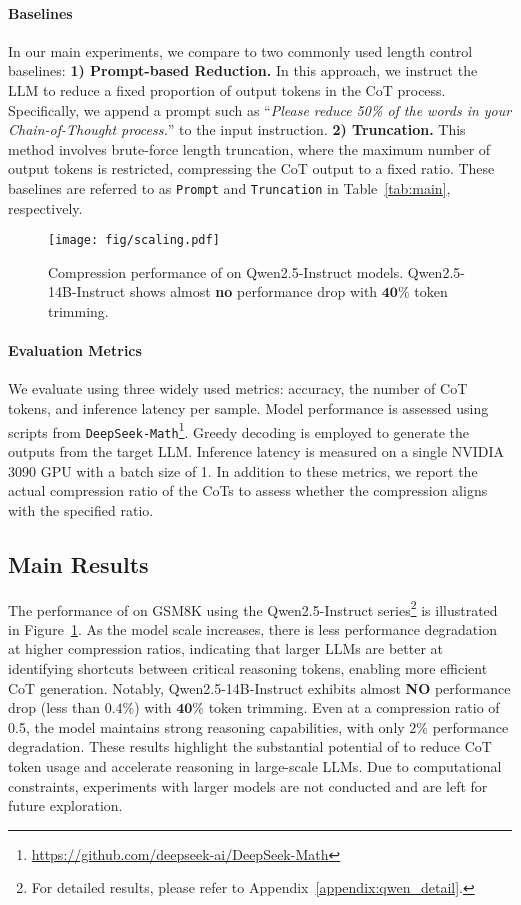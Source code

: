 \paragraph{Baselines} 
In our main experiments, we compare \method to two commonly used length control baselines: \textbf{1) Prompt-based Reduction.} In this approach, we instruct the LLM to reduce a fixed proportion of output tokens in the CoT process. Specifically, we append a prompt such as ``\textit{Please reduce 50\% of the words in your Chain-of-Thought process.}'' to the input instruction. \textbf{2) Truncation.} This method involves brute-force length truncation, where the maximum number of output tokens is restricted, compressing the CoT output to a fixed ratio. These baselines are referred to as \texttt{Prompt} and \texttt{Truncation} in Table~\ref{tab:main}, respectively.

\begin{figure}[t]
\centering
    \texttt{[image: fig/scaling.pdf]}
    \caption{Compression performance of \method on Qwen2.5-Instruct models. Qwen2.5-14B-Instruct shows almost \textbf{no} performance drop with $\bm{40\%}$ token trimming.}
    \label{fig:qwen-scaling}
\end{figure}

\paragraph{Evaluation Metrics} 
We evaluate \method using three widely used metrics: accuracy, the number of CoT tokens, and inference latency per sample. Model performance is assessed using scripts from \texttt{DeepSeek-Math}\footnote{\url{https://github.com/deepseek-ai/DeepSeek-Math}}. Greedy decoding is employed to generate the outputs from the target LLM. Inference latency is measured on a single NVIDIA 3090 GPU with a batch size of 1. In addition to these metrics, we report the actual compression ratio of the CoTs to assess whether the compression aligns with the specified ratio.



\subsection{Main Results}
\label{sec:main-exp}
The performance of \method on GSM8K using the Qwen2.5-Instruct series\footnote{For detailed results, please refer to Appendix~\ref{appendix:qwen_detail}.} is illustrated in Figure~\ref{fig:qwen-scaling}. As the model scale increases, there is less performance degradation at higher compression ratios, indicating that larger LLMs are better at identifying shortcuts between critical reasoning tokens, enabling more efficient CoT generation. Notably, Qwen2.5-14B-Instruct exhibits almost \textbf{NO} performance drop (less than $0.4\%$) with $\bm{40\%}$ token trimming. Even at a compression ratio of 0.5, the model maintains strong reasoning capabilities, with only $2\%$ performance degradation. These results highlight the substantial potential of \method to reduce CoT token usage and accelerate reasoning in large-scale LLMs. Due to computational constraints, experiments with larger models are not conducted and are left for future exploration.

